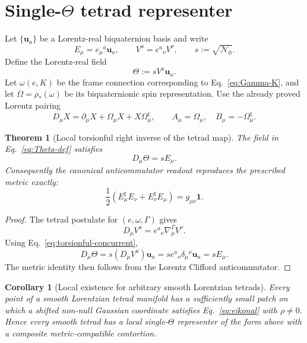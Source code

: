 \documentclass[12pt,a4paper]{article}
\newtheorem{theorem}[definition]{Theorem}
\newtheorem{corollary}[definition]{Corollary}
\theoremstyle{remark}\newtheorem{remark}[definition]{Remark}
\begin{document}
\section{Single-$\Theta$ tetrad representer}
Let $\{\mathbf u_a\}$ be a Lorentz-real biquaternion basis and write
\begin{equation}
 E_\mu=e_\mu{}^a\mathbf u_a,
 \qquad
 V^a=e^a{}_{\nu}V^\nu,
 \qquad
 s:=\sqrt{\mathcal N_0}.
\end{equation}
Define the Lorentz-real field
\begin{equation}
 \boxed{\Theta:=sV^a\mathbf u_a.}
 \label{eq:Theta-def}
\end{equation}
Let $\omega(e,K)$ be the frame connection corresponding to
Eq.~\eqref{eq:Gamma-K}, and let $\Omega=\rho_*(\omega)$ be its
biquaternionic spin representation.  Use the already proved Lorentz pairing
\begin{equation}
 D_\mu X=\partial_\mu X+\Omega_\mu X+X\Omega_\mu^\ddagger,
 \qquad
 A_\mu=\Omega_\mu,
 \quad B_\mu=-\Omega_\mu^\ddagger.
 \label{eq:pure-pair}
\end{equation}

\begin{theorem}[Local torsionful right inverse of the tetrad map]
The field in Eq.~\eqref{eq:Theta-def} satisfies
\begin{equation}
 \boxed{D_\mu\Theta=sE_\mu.}
 \label{eq:right-inverse}
\end{equation}
Consequently the canonical anticommutator readout reproduces the prescribed
metric exactly:
\begin{equation}
 \frac12(E_\mu^\sharp E_\nu+E_\nu^\sharp E_\mu)
 =g_{\mu\nu}\mathbf1.
\end{equation}
\end{theorem}

\begin{proof}
The tetrad postulate for $(e,\omega,\Gamma)$ gives
\begin{equation}
 D_\mu V^a=e^a{}_{\nu}\nabla^{\Gamma}_\mu V^\nu.
\end{equation}
Using Eq.~\eqref{eq:torsionful-concurrent},
\begin{equation}
 D_\mu\Theta
 =s(D_\mu V^a)\mathbf u_a
 =s e^a{}_{\nu}\delta_\mu{}^\nu\mathbf u_a
 =sE_\mu.
\end{equation}
The metric identity then follows from the Lorentz Clifford anticommutator.
\end{proof}

\begin{corollary}[Local existence for arbitrary smooth Lorentzian tetrads]
Every point of a smooth Lorentzian tetrad manifold has a sufficiently small
patch on which a shifted non-null Gaussian coordinate satisfies
Eq.~\eqref{eq:eikonal} with $\rho\ne0$.  Hence every smooth tetrad has a local
single-$\Theta$ representer of the form above with a composite
metric-compatible contortion.
\end{corollary}
\end{document}
